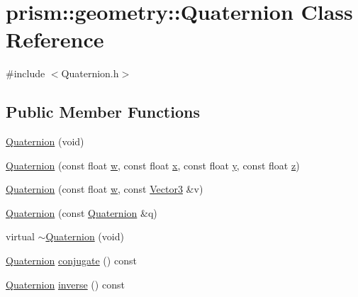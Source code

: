 \hypertarget{classprism_1_1geometry_1_1_quaternion}{}\section{prism\+:\+:geometry\+:\+:Quaternion Class Reference}
\label{classprism_1_1geometry_1_1_quaternion}


{\ttfamily \#include $<$Quaternion.\+h$>$}

\subsection*{Public Member Functions}
\begin{DoxyCompactItemize}
\item 
\hyperlink{classprism_1_1geometry_1_1_quaternion_a91ccc5fc76c77fb1bae3206a60ffc714}{Quaternion} (void)
\item 
\hyperlink{classprism_1_1geometry_1_1_quaternion_accd6baeae33e6dc4958cee822d42206e}{Quaternion} (const float \hyperlink{classprism_1_1geometry_1_1_quaternion_a04d1be00d79966209148fc9e0dcd8d29}{w}, const float \hyperlink{classprism_1_1geometry_1_1_quaternion_a64b19a3673ae2d7a103ad4edfb70874f}{x}, const float \hyperlink{classprism_1_1geometry_1_1_quaternion_a1eb758ab66dc23e282d8d9c1d891db25}{y}, const float \hyperlink{classprism_1_1geometry_1_1_quaternion_a0555ec659f2dff30070bfa05c129aa1b}{z})
\item 
\hyperlink{classprism_1_1geometry_1_1_quaternion_a6be1a9247ec273e11e573b64ebe7fcd0}{Quaternion} (const float \hyperlink{classprism_1_1geometry_1_1_quaternion_a04d1be00d79966209148fc9e0dcd8d29}{w}, const \hyperlink{classprism_1_1geometry_1_1_vector3}{Vector3} \&v)
\item 
\hyperlink{classprism_1_1geometry_1_1_quaternion_a873db343286dfa36e742e62c076e70a7}{Quaternion} (const \hyperlink{classprism_1_1geometry_1_1_quaternion}{Quaternion} \&q)
\item 
virtual \hyperlink{classprism_1_1geometry_1_1_quaternion_a27853f52b0907a630dd3b8a8a86f89f8}{$\sim$\+Quaternion} (void)
\item 
\hyperlink{classprism_1_1geometry_1_1_quaternion}{Quaternion} \hyperlink{classprism_1_1geometry_1_1_quaternion_a934ba4c328d18803576fd07f2cd390ba}{conjugate} () const 
\item 
\hyperlink{classprism_1_1geometry_1_1_quaternion}{Quaternion} \hyperlink{classprism_1_1geometry_1_1_quaternion_a9ae7c21e6161e2bbb4b9fd07ae8ac9a8}{inverse} () const 

\end{DoxyCompactItemize}
